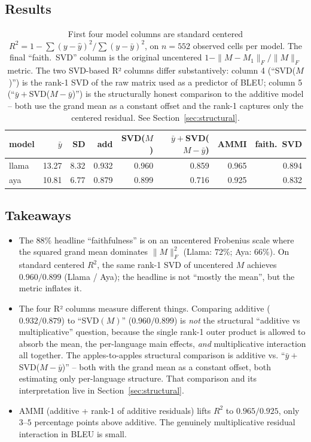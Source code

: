 \documentclass[11pt]{article}
\begin{document}
\subsection{Results}

\begin{table}[h]
\centering
\small
\begin{tabular}{lrrrrrrr}
\toprule
model & $\bar y$ & SD & add & SVD($M$) & $\bar y + $SVD($M-\bar y$) & AMMI & faith.\ SVD \\
\midrule
llama & 13.27 & 8.32 & 0.932 & 0.960 & 0.859 & 0.965 & 0.894 \\
aya   & 10.81 & 6.77 & 0.879 & 0.899 & 0.716 & 0.925 & 0.832 \\
\bottomrule
\end{tabular}
\caption{First four model columns are standard centered $R^2 =
1 - \sum(y-\hat y)^2 / \sum(y-\bar y)^2$, on $n=552$ observed cells per
model. The final ``faith.\ SVD'' column is the original uncentered $1 -
\|M - M_1\|_F / \|M\|_F$ metric. The two SVD-based R² columns differ
substantively: column 4 (``SVD($M$)'') is the rank-1 SVD of the raw matrix
used as a predictor of BLEU; column 5 (``$\bar y + $SVD($M-\bar y$)'') is
the structurally honest comparison to the additive model -- both use the
grand mean as a constant offset and the rank-1 captures only the centered
residual. See Section~\ref{sec:structural}.}
\end{table}

\subsection{Takeaways}

\begin{itemize}
  \item The $88\%$ headline ``faithfulness'' is on an uncentered Frobenius
    scale where the squared grand mean dominates $\|M\|_F^2$ (Llama: $72\%$;
    Aya: $66\%$). On standard centered $R^2$, the same rank-1 SVD of
    uncentered $M$ achieves $0.960 / 0.899$ (Llama / Aya); the headline is
    not ``mostly the mean'', but the metric inflates it.
  \item The four R² columns measure different things. Comparing additive
    ($0.932 / 0.879$) to ``SVD$(M)$'' ($0.960 / 0.899$) is \emph{not} the
    structural ``additive vs multiplicative'' question, because the single
    rank-1 outer product is allowed to absorb the mean, the per-language
    main effects, \emph{and} multiplicative interaction all together. The
    apples-to-apples structural comparison is additive vs.
    ``$\bar y + $SVD($M - \bar y$)'' -- both with the grand mean as a
    constant offset, both estimating only per-language structure. That
    comparison and its interpretation live in
    Section~\ref{sec:structural}.
  \item AMMI (additive + rank-1 of additive residuals) lifts $R^2$ to
    $0.965 / 0.925$, only $3$--$5$ percentage points above additive. The
    genuinely multiplicative residual interaction in BLEU is small.
\end{itemize}
\end{document}
